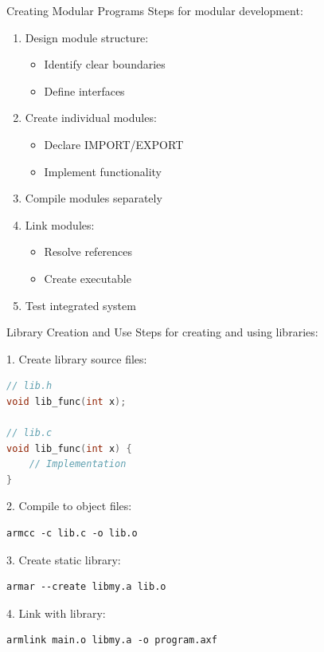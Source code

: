 \begin{KR}{Creating Modular Programs}
Steps for modular development:
\begin{enumerate}
  \item Design module structure:
    \begin{itemize}
      \item Identify clear boundaries
      \item Define interfaces
    \end{itemize}
  \item Create individual modules:
    \begin{itemize}
      \item Declare IMPORT/EXPORT
      \item Implement functionality
    \end{itemize}
  \item Compile modules separately
  \item Link modules:
    \begin{itemize}
      \item Resolve references
      \item Create executable
    \end{itemize}
  \item Test integrated system
\end{enumerate}
\end{KR}

\begin{KR}{Library Creation and Use}
Steps for creating and using libraries:

1. Create library source files:
\begin{lstlisting}[language=C, style=basesmol]
// lib.h
void lib_func(int x);

// lib.c
void lib_func(int x) {
    // Implementation
}
\end{lstlisting}

2. Compile to object files:
\begin{lstlisting}[style=basesmol]
armcc -c lib.c -o lib.o
\end{lstlisting}

3. Create static library:
\begin{lstlisting}[style=basesmol]
armar --create libmy.a lib.o
\end{lstlisting}

4. Link with library:
\begin{lstlisting}[style=basesmol]
armlink main.o libmy.a -o program.axf
\end{lstlisting}
\end{KR}



